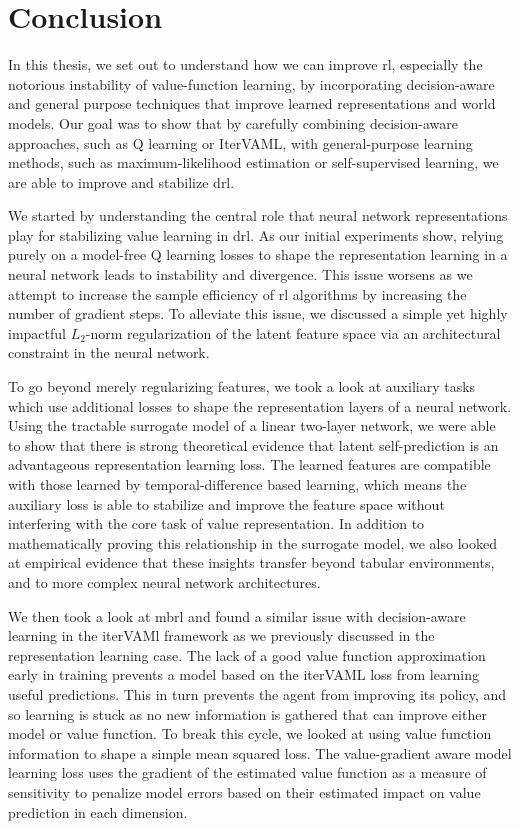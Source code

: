 \chapter{Conclusion}
\label{chap:conclusion}

In this thesis, we set out to understand how we can improve \ac{rl}, especially the notorious instability of value-function learning, by incorporating decision-aware and general purpose techniques that improve learned representations and world models.
Our goal was to show that by carefully combining decision-aware approaches, such as Q learning or IterVAML, with general-purpose learning methods, such as maximum-likelihood estimation or self-supervised learning, we are able to improve and stabilize \ac{drl}.

We started by understanding the central role that neural network representations play for stabilizing value learning in \ac{drl}.
As our initial experiments show, relying purely on a model-free Q learning losses to shape the representation learning in a neural network leads to instability and divergence.
This issue worsens as we attempt to increase the sample efficiency of \ac{rl} algorithms by increasing the number of gradient steps.
To alleviate this issue, we discussed a simple yet highly impactful $L_2$-norm regularization of the latent feature space via an architectural constraint in the neural network.

To go beyond merely regularizing features, we took a look at auxiliary tasks which use additional losses to shape the representation layers of a neural network.
Using the tractable surrogate model of a linear two-layer network, we were able to show that there is strong theoretical evidence that latent self-prediction is an advantageous representation learning loss.
The learned features are compatible with those learned by temporal-difference based learning, which means the auxiliary loss is able to stabilize and improve the feature space without interfering with the core task of value representation.
In addition to mathematically proving this relationship in the surrogate model, we also looked at empirical evidence that these insights transfer beyond tabular environments, and to more complex neural network architectures.

We then took a look at \ac{mbrl} and found a similar issue with decision-aware learning in the iterVAMl framework as we previously discussed in the representation learning case.
The lack of a good value function approximation early in training prevents a model based on the iterVAML loss from learning useful predictions.
This in turn prevents the agent from improving its policy, and so learning is stuck as no new information is gathered that can improve either model or value function.
To break this cycle, we looked at using value function information to shape a simple mean squared loss.
The value-gradient aware model learning loss uses the gradient of the estimated value function as a measure of sensitivity to penalize model errors based on their estimated impact on value prediction in each dimension.

